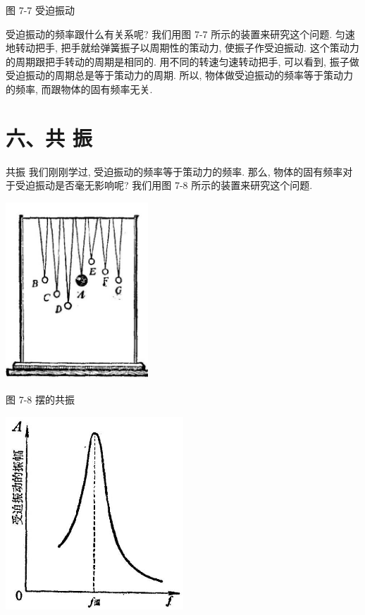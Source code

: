 \documentclass[10pt]{article}
\begin{document}
图 7-7 受迫振动

受迫振动的频率跟什么有关系呢? 我们用图 7-7 所示的装置来研究这个问题. 匀速地转动把手, 把手就给弹簧振子以周期性的策动力, 使振子作受迫振动. 这个策动力的周期跟把手转动的周期是相同的. 用不同的转速匀速转动把手, 可以看到, 振子做受迫振动的周期总是等于策动力的周期. 所以, 物体做受迫振动的频率等于策动力的频率, 而跟物体的固有频率无关.

\section*{六、共 振}

共振 我们刚刚学过, 受迫振动的频率等于策动力的频率. 那么, 物体的固有频率对于受迫振动是否毫无影响呢? 我们用图 7-8 所示的装置来研究这个问题.

\begin{center}
\includegraphics[max width=0.4\textwidth]{images/01912d55-147c-70aa-b0e0-1782a122f948_202_783099.jpg}
\end{center}

图 7-8 摆的共振

\begin{center}
\includegraphics[max width=0.5\textwidth]{images/01912d55-147c-70aa-b0e0-1782a122f948_202_601122.jpg}
\end{center}
\end{document}
